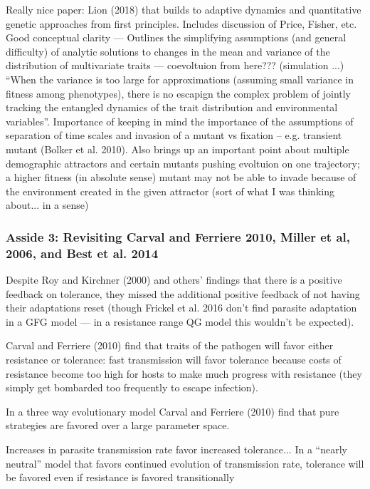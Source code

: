 \documentclass{article}
\begin{document}
Really nice paper: Lion (2018) that builds to adaptive dynamics and quantitative genetic approaches from first principles. Includes discussion of Price, Fisher, etc. Good conceptual clarity --- Outlines the simplifying assumptions (and general difficulty) of analytic solutions to changes in the mean and variance of the distribution of multivariate traits --- coevoltuion from here??? (simulation ...) ``When the variance is too large for approximations (assuming small variance in fitness among phenotypes), there is no escapign the complex problem of jointly tracking the entangled dynamics of the trait distribution and environmental variables''. Importance of keeping in mind the importance of the assumptions of separation of time scales and invasion of a mutant vs fixation -- e.g. transient mutant (Bolker et al. 2010). Also brings up an important point about multiple demographic attractors and certain mutants pushing evoltuion on one trajectory; a higher fitness (in absolute sense) mutant may not be able to invade because of the environment created in the given attractor (sort of what I was thinking about... in a sense)

\subsubsection*{Asside 3: Revisiting Carval and Ferriere 2010, Miller et al, 2006, and Best et al. 2014}

Despite Roy and Kirchner (2000) and others' findings that there is a positive feedback on tolerance, they missed the additional positive feedback of not having their adaptations reset (though Frickel et al. 2016 don't find parasite adaptation in a GFG model --- in a resistance range QG model this wouldn't be expected). 

Carval and Ferriere (2010) find that traits of the pathogen will favor either resistance or tolerance: fast transmission will favor tolerance because costs of resistance become too high for hosts to make much progress with resistance (they simply get bombarded too frequently to escape infection).

In a three way evolutionary model Carval and Ferriere (2010) find that pure strategies are favored over a large parameter space.

Increases in parasite transmission rate favor increased tolerance... In a ``nearly neutral'' model that favors continued evolution of transmission rate, tolerance will be favored even if resistance is favored transitionally
\end{document}
